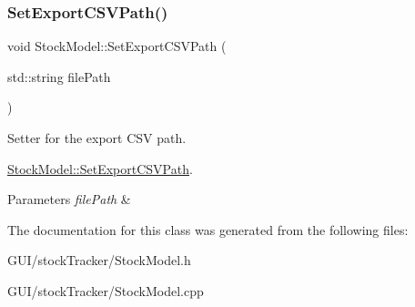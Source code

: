 \subsubsection{\texorpdfstring{Set\+Export\+C\+S\+V\+Path()}{SetExportCSVPath()}}
{\footnotesize\ttfamily void Stock\+Model\+::\+Set\+Export\+C\+S\+V\+Path (\begin{DoxyParamCaption}\item[{std\+::string}]{file\+Path }\end{DoxyParamCaption})}



Setter for the export C\+SV path. 

\mbox{\hyperlink{class_stock_model_a4b0150fddd7fe2686b693f877ba84cac}{Stock\+Model\+::\+Set\+Export\+C\+S\+V\+Path}}.


\begin{DoxyParams}{Parameters}
{\em file\+Path} & \\
\hline
\end{DoxyParams}


The documentation for this class was generated from the following files\+:\begin{DoxyCompactItemize}
\item 
G\+U\+I/stock\+Tracker/Stock\+Model.\+h\item 
G\+U\+I/stock\+Tracker/Stock\+Model.\+cpp\end{DoxyCompactItemize}
